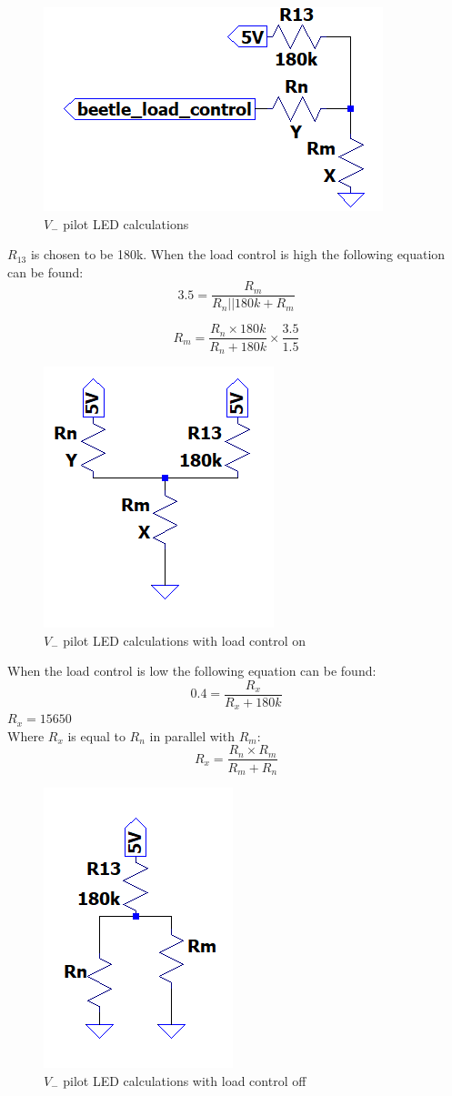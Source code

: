 \begin{figure}[!htb]
	\centering
	\includegraphics[width=0.2\linewidth]{Figures/A7/V-main.png}
	\caption{$V_-$ pilot LED calculations }
	\label{fig:v-main}
\end{figure}


$R_{13}$ is chosen to be 180k\textohm. When the load control is high the following equation can be found:
\begin{equation}
	3.5=\frac{R_m}{R_{n}||180k+R_m}
\end{equation}

\begin{equation}
	R_m=\frac{R_n\times 180k}{R_{n}+180k}\times \frac{3.5}{1.5}
	\label{eq:rm}
\end{equation}
\begin{figure}[!htb]
	\centering
	\includegraphics[width=0.2\linewidth]{Figures/A7/5Vv-.png}
	\caption{$V_-$ pilot LED calculations with load control on }
	\label{fig:v-5v}
\end{figure}



When the load control is low the following equation can be found:
\begin{equation}
	0.4=\frac{R_x}{R_x+180k}
\end{equation}
$R_x=15650$\textohm \\
Where $R_x$ is equal to $R_n$ in parallel with $R_m$:
\begin{equation}
	R_x=\frac{R_n\times R_m}{R_m+R_n}
	\label{eq:rx}
\end{equation}
\begin{figure}[!htb]
	\centering
	\includegraphics[width=0.2\linewidth]{Figures/A7/0Vv-.png}
	\caption{$V_-$ pilot LED calculations with load control off }
	\label{fig:v-0v}
\end{figure}

